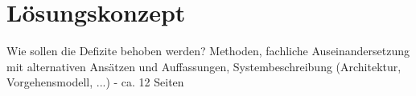 \chapter{Lösungskonzept}
\thispagestyle{fancy}

Wie sollen die Defizite behoben werden? Methoden, fachliche Auseinandersetzung mit alternativen Ansätzen und Auffassungen, Systembeschreibung (Architektur, Vorgehensmodell, ...) - ca. 12 Seiten